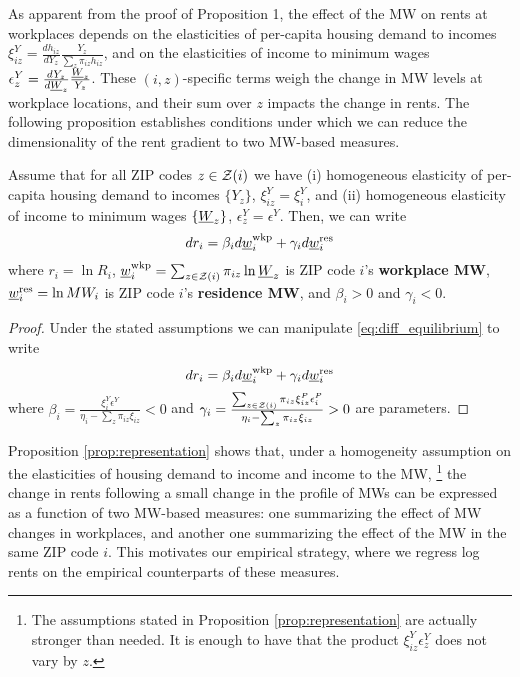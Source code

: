 As apparent from the proof of Proposition 1, the effect of the MW on rents
at workplaces depends on the elasticities of per-capita housing demand to incomes
$\xi^Y_{iz} = \frac{d h_{iz}}{d Y_z} \frac{Y_z}{\sum_z \pi_{iz} h_{iz}}$, and
on the elasticities of income to minimum wages
$\epsilon_z^Y = \frac{d Y_z}{d \underline{W}_z} \frac{\underline{W}_z}{Y_z}$.
These $(i,z)$-specific terms weigh the change in MW levels at workplace locations,
and their sum over $z$ impacts the change in rents.
The following proposition establishes conditions under which we can reduce the 
dimensionality of the rent gradient to two MW-based measures.

\begin{prop}[Representation]\label{prop:representation}
    Assume that for all ZIP codes $z\in\mathcal{Z}(i)$ we have
    (i) homogeneous elasticity of per-capita housing demand to incomes $\{Y_z\}$,
    $\xi^Y_{iz}=\xi^Y_{i}$, and
    (ii) homogeneous elasticity of income to minimum wages $\{\underline{W}_z\}$,
    $\epsilon_z^Y=\epsilon^Y$.
    Then, we can write
    $$
    d r_{i} = \beta_i d \underline{w}_{i}^{\text{wkp}} + \gamma_i d \underline{w}^{\text{res}}_i
    $$
    where 
    $r_{i} = \ln R_i$,
    $\underline{w}_{i}^{\text{wkp}} = \sum_{z\in\mathcal{Z}(i)} \pi_{iz} \ln \underline{W}_z$ 
    is ZIP code $i$'s \textbf{workplace MW}, 
    $\underline{w}^{\text{res}}_i = \ln MW_i$ 
    is ZIP code $i$'s \textbf{residence MW}, and 
    $\beta_i > 0$ and $\gamma_i < 0$.
\end{prop}
\begin{proof}
    Under the stated assumptions we can manipulate \eqref{eq:diff_equilibrium} 
    to write
    \begin{equation} \label{eq:theory_representation}
        d r_i = \beta_i  d \underline{w}^{\text{wkp}}_i
              + \gamma_i d \underline{w}^{\text{res}}_i
    \end{equation}
    where
    $\beta_i = \frac{\xi_{i}^{Y}\epsilon^{Y}}
                     {\eta_{i} - \sum_z \pi_{iz} \xi_{iz}} 
              < 0$ and
    $\gamma_i = \frac{\sum_{z\in\mathcal{Z}(i)}\pi_{iz}\xi_{iz}^{P}\epsilon_{i}^{P}}
                    {\eta_{i} - \sum_z \pi_{iz} \xi_{iz}} 
              > 0$
    are parameters.
\end{proof}

Proposition \ref{prop:representation} shows that, under a homogeneity assumption
on the elasticities of housing demand to income and income to the MW,%
\footnote{The assumptions stated in Proposition \ref{prop:representation} are 
actually stronger than needed.
It is enough to have that the product $\xi^Y_{iz} \epsilon_z^Y$ does not vary 
by $z$.}
the change in rents following a small change in the profile of MWs can be 
expressed as a function of two MW-based measures:
one summarizing the effect of MW changes in workplaces,
and another one summarizing the effect of the MW in the same ZIP code $i$.
This motivates our empirical strategy, where we regress log rents on the empirical
counterparts of these measures.

